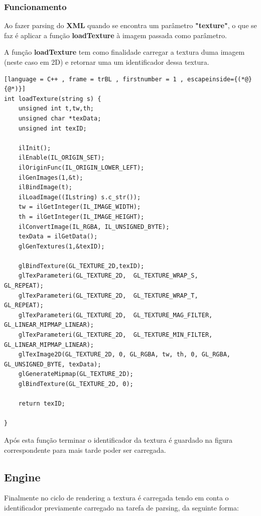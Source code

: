 \documentclass[a4paper]{article}
\begin{document}
\subsubsection{Funcionamento}
\label{sec:funcionamentot}

Ao fazer parsing do \textbf{XML} quando se encontra um parâmetro \textbf{"texture"}, o que se faz é aplicar a função \textbf{loadTexture} à imagem passada como parâmetro.

A função \textbf{loadTexture} tem como finalidade carregar a textura duma imagem (neste caso em 2D) e retornar uma um identificador dessa textura.

\begin{lstlisting}[language = C++ , frame = trBL , firstnumber = 1 , escapeinside={(*@}{@*)}]
int loadTexture(string s) {
    unsigned int t,tw,th;
    unsigned char *texData;
    unsigned int texID;

    ilInit();
    ilEnable(IL_ORIGIN_SET);
    ilOriginFunc(IL_ORIGIN_LOWER_LEFT);
    ilGenImages(1,&t);
    ilBindImage(t);
    ilLoadImage((ILstring) s.c_str());
    tw = ilGetInteger(IL_IMAGE_WIDTH);
    th = ilGetInteger(IL_IMAGE_HEIGHT);
    ilConvertImage(IL_RGBA, IL_UNSIGNED_BYTE);
    texData = ilGetData();
    glGenTextures(1,&texID);

    glBindTexture(GL_TEXTURE_2D,texID);
    glTexParameteri(GL_TEXTURE_2D,  GL_TEXTURE_WRAP_S,      GL_REPEAT);
    glTexParameteri(GL_TEXTURE_2D,  GL_TEXTURE_WRAP_T,      GL_REPEAT);
    glTexParameteri(GL_TEXTURE_2D,  GL_TEXTURE_MAG_FILTER,      GL_LINEAR_MIPMAP_LINEAR);
    glTexParameteri(GL_TEXTURE_2D,  GL_TEXTURE_MIN_FILTER, GL_LINEAR_MIPMAP_LINEAR);
    glTexImage2D(GL_TEXTURE_2D, 0, GL_RGBA, tw, th, 0, GL_RGBA, GL_UNSIGNED_BYTE, texData);
    glGenerateMipmap(GL_TEXTURE_2D);
    glBindTexture(GL_TEXTURE_2D, 0);

    return texID;

}
\end{lstlisting}

Após esta função terminar o identificador da textura é guardado na figura correspondente para mais tarde poder ser carregada.

\subsection{Engine}
\label{sec:enginet}

Finalmente no ciclo de rendering a textura é carregada tendo em conta o identificador previamente carregado na tarefa de parsing, da seguinte forma:
\end{document}
